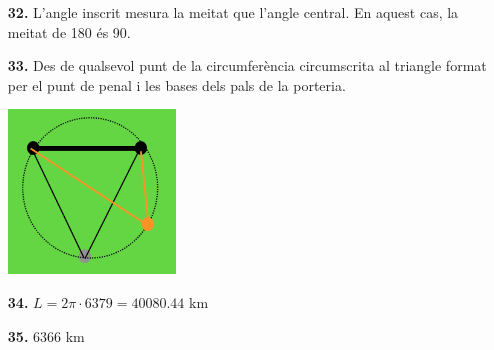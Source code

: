 \documentclass[a4paper, pdf, twoside]{book}
\begin{document}
\begin{multicols}{2}
\begin{enumerate}
\vspace{0.25cm}
\item[\fontfamily{phv}\selectfont\color{blue}\textbf{32. }] 
L'angle inscrit mesura la meitat que l'angle central. En aquest cas, la meitat de 180 és 90.
\vspace{0.25cm}
\item[\fontfamily{phv}\selectfont\color{blue}\textbf{33. }] 
 Des de qualsevol punt de la circumferència circumscrita al triangle format per el punt de penal i les bases dels pals de la porteria. \par \includegraphics [width=0.35\textwidth ]{img-sol/t9-33}
\vspace{0.25cm}
\item[\fontfamily{phv}\selectfont\color{blue}\textbf{34. }] 
$L=2\pi \cdot 6379 = 40080.44$ km
\vspace{0.25cm}
\item[\fontfamily{phv}\selectfont\color{blue}\textbf{35. }] 
6366 km
 \end{enumerate}
\vspace{0.3cm}



\end{multicols}
\end{document}
